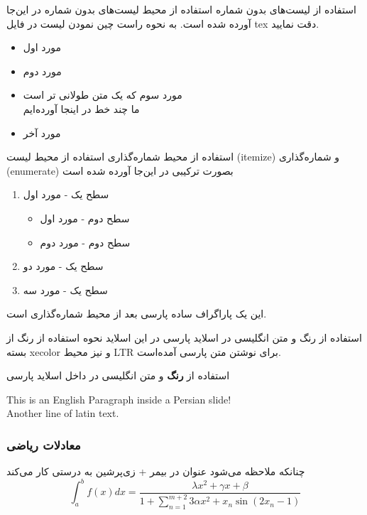 \documentclass[xcolor=dvipsnames, professionalfonts, aspectratio=169, 11pt]{beamer}
\makeatletter
\newcommand{ \RTList}{\raggedleft\rightskip\@totalleftmargin}
\makeatother
\begin{document}
\begin{persian}
\begin{frame}{استفاده از لیست‌های بدون شماره}
استفاده از محیط لیست‌های بدون شماره در این‌جا آورده شده است. به نحوه راست چین نمودن لیست در فایل tex دقت نمایید.
\begin{itemize}\RTList
	\item مورد اول
	\item مورد دوم
	\item مورد سوم که یک متن طولانی تر است\\ ما چند خط در اینجا آورده‌ایم
	\item مورد آخر
\end{itemize}
\end{frame}

\begin{frame}{استفاده از محیط شماره‌گذاری}
 استفاده از محیط لیست (itemize) و شماره‌گذاری (enumerate) بصورت ترکیبی در این‌جا آورده شده است
 \begin{enumerate}\RTList
      \item سطح یک - مورد اول
	      \begin{itemize}\RTList
	      		\item  سطح دوم - مورد اول
	     		 \item  سطح دوم - مورد دوم
	      \end{itemize}
      \item سطح یک - مورد دو
      \item سطح یک - مورد سه
 \end{enumerate}

این یک پاراگراف ساده پارسی بعد از محیط شماره‌گذاری است.
\end{frame}


\begin{frame}{استفاده از رنگ و متن انگلیسی در اسلاید پارسی}
در این اسلاید نحوه استفاده از رنگ از بسته xecolor و نیز محیط LTR برای نوشتن متن پارسی آمده‌است.
\vspace{1cm}

{
	استفاده از \textbf{رنگ} و متن انگلیسی در داخل اسلاید پارسی
}
\vspace{1cm}
{
	\begin{LTR}
		This is an English Paragraph inside a Persian slide!\\
		Another line of latin text.
	\end{LTR}
}

\end{frame}


\begin{frame}
\frametitle{معادلات ریاضی}
چنانکه ملاحظه می‌شود عنوان در بیمر + زی‌پرشین به درستی کار می‌کند
\vspace{2cm}
\begin{equation}
\int_{a}^{b} f(x)dx = \frac{\lambda x^2 + \gamma x + \beta}{1+\sum_{n=1}^{m+2} 3 \alpha x^2 +x_n \sin(2 x_n -1)}
\end{equation}


\end{frame}
\end{persian}
\end{document}
